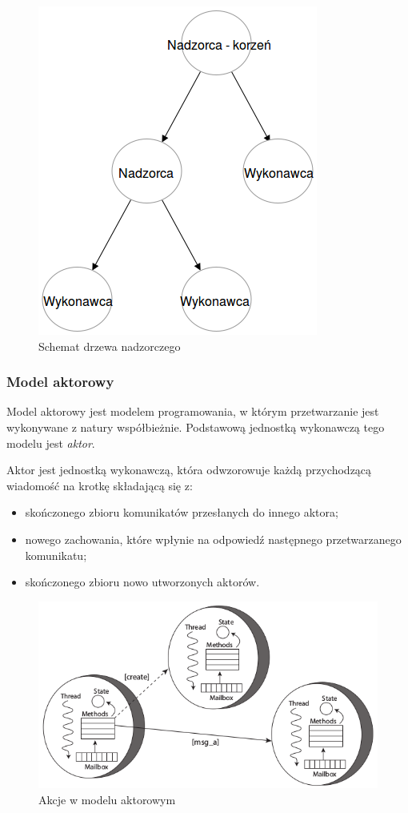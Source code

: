 \documentclass[12pt,twoside]{article}
\providecommand{\tightlist}{  \setlength{\itemsep}{0pt}\setlength{\parskip}{0pt}}
\begin{document}
\begin{figure}[htbp]
\centering
\includegraphics[resolution=130]{graphics/supervision-tree.png}
\caption{Schemat drzewa nadzorczego}
\end{figure}

\subsubsection{Model aktorowy}\label{model-aktorowy}

Model aktorowy jest modelem programowania, w którym przetwarzanie jest
wykonywane z natury współbieżnie. Podstawową jednostką wykonawczą tego
modelu jest \emph{aktor}.

Aktor jest jednostką wykonawczą, która odwzorowuje każdą przychodzącą
wiadomość na krotkę składającą się z:

\begin{itemize}
\tightlist
\item
  skończonego zbioru komunikatów przesłanych do innego aktora;
\item
  nowego zachowania, które wpłynie na odpowiedź następnego
  przetwarzanego komunikatu;
\item
  skończonego zbioru nowo utworzonych aktorów.
\end{itemize}

\begin{figure}[htbp]
\centering
\includegraphics[resolution=130]{graphics/actor-messages.png}
\caption{Akcje w modelu aktorowym \autocite{karmani2009actor}}
\end{figure}
\end{document}
